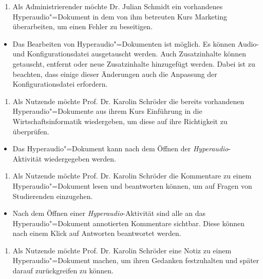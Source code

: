 \vspace{0.25cm}
\begin{enumerate}[resume*]
\item \label{US-Admin-Bearbeiten-Eval} Als Administrierender möchte Dr. Julian Schmidt ein vorhandenes Hyperaudio"=Dokument in dem von ihm betreuten Kurs \glqq Marketing\grqq{} überarbeiten, um einen Fehler zu beseitigen.
\end{enumerate}
\begin{itemize}[resume*]
\item[\Checkmark]
Das Bearbeiten von Hyperaudio"=Dokumenten ist möglich. Es können Audio- und Konfigurationsdatei ausgetauscht werden. Auch Zusatzinhalte können getauscht, entfernt oder neue Zusatzinhalte hinzugefügt werden. Dabei ist zu beachten, dass einige dieser Änderungen auch die Anpassung der Konfigurationsdatei erfordern.
\end{itemize}
\vspace{0.25cm}
\begin{enumerate}[resume*]
\item \label{US-Wiedergabe-Eval} Als Nutzende möchte Prof. Dr. Karolin Schröder die bereits vorhandenen Hyperaudio"=Dokumente aus ihrem Kurs \glqq Einführung in die Wirtschaftsinformatik\grqq{} wiedergeben, um diese auf ihre Richtigkeit zu überprüfen.
\end{enumerate}
\begin{itemize}[resume*]
\item[\Checkmark]
Das Hyperaudio"=Dokument kann nach dem Öffnen der \textit{Hyperaudio}-Aktivität wiedergegeben werden.
\end{itemize}
\vspace{0.25cm}
\begin{enumerate}[resume*]
\item \label{US-Antwort-L-Eval} Als Nutzende möchte Prof. Dr. Karolin Schröder die Kommentare zu einem Hyperaudio"=Dokument lesen und beantworten können, um auf Fragen von Studierenden einzugehen.
\end{enumerate}
\begin{itemize}[resume*]
\item[\Checkmark]
Nach dem Öffnen einer \textit{Hyperaudio}-Aktivität sind alle an das Hyperaudio"=Dokument annotierten Kommentare sichtbar. Diese können nach einem Klick auf \glqq Antworten\grqq{} beantwortet werden.
\end{itemize}
\vspace{0.25cm}
\begin{enumerate}[resume*]
\item \label{US-Notiz-L-Eval} Als Nutzende möchte Prof. Dr. Karolin Schröder eine Notiz zu einem Hyperaudio"=Dokument machen, um ihren Gedanken festzuhalten und später darauf zurückgreifen zu können.
\end{enumerate}
